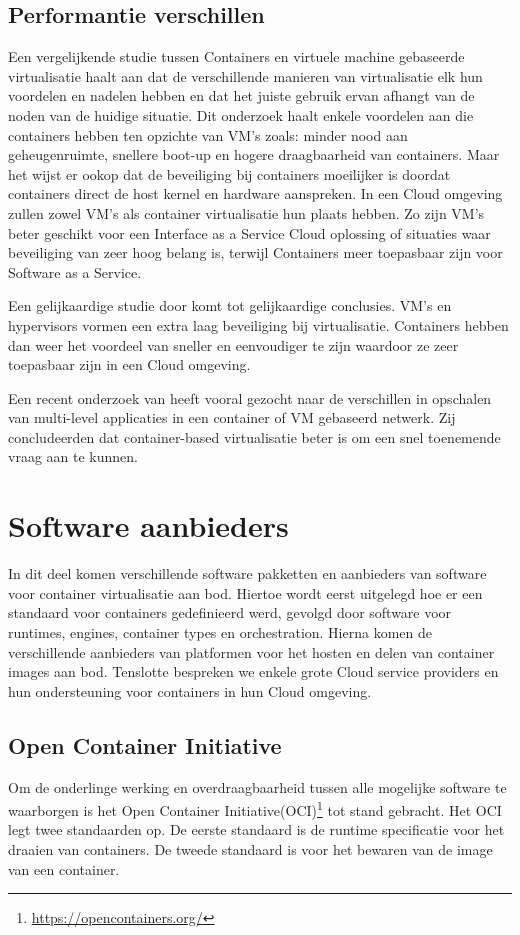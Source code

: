 \subsection{Performantie verschillen}
Een vergelijkende studie tussen Containers en virtuele machine gebaseerde virtualisatie\autocite{Yadav2018} haalt aan dat de verschillende manieren van virtualisatie elk hun voordelen en nadelen hebben en dat het juiste gebruik ervan afhangt van de noden van de huidige situatie. Dit onderzoek haalt enkele voordelen aan die containers hebben ten opzichte van VM’s zoals: minder nood aan geheugenruimte, snellere boot-up en hogere draagbaarheid van containers. Maar het wijst er ookop dat de beveiliging bij containers moeilijker is doordat containers direct de host kernel en hardware aanspreken. In een Cloud omgeving zullen zowel VM’s als container virtualisatie hun plaats hebben. Zo zijn VM’s beter geschikt voor een Interface as a Service Cloud oplossing of situaties waar beveiliging van zeer hoog belang is, terwijl Containers meer toepasbaar zijn voor Software as a Service.

Een gelijkaardige studie door \textcite{Eder2016} komt tot gelijkaardige conclusies. VM’s en hypervisors vormen een extra laag beveiliging bij virtualisatie. Containers hebben dan weer het voordeel van sneller en eenvoudiger te zijn waardoor ze zeer toepasbaar zijn in een Cloud omgeving.

Een recent onderzoek van \textcite{Abdullah2019} heeft vooral gezocht naar de verschillen in opschalen van multi-level applicaties in een container of VM gebaseerd netwerk. Zij concludeerden dat container-based virtualisatie beter is om een snel toenemende vraag aan te kunnen.


\section{Software aanbieders}
In dit deel komen verschillende software pakketten en aanbieders van software voor container virtualisatie aan bod. Hiertoe wordt eerst uitgelegd hoe er een standaard voor containers gedefinieerd werd, gevolgd door software voor runtimes, engines, container types en orchestration. Hierna komen de verschillende aanbieders van platformen voor het hosten en delen van container images aan bod. Tenslotte bespreken we enkele grote Cloud service providers en hun ondersteuning voor containers in hun Cloud omgeving.


\subsection{Open Container Initiative}
Om de onderlinge werking en overdraagbaarheid tussen alle mogelijke software te waarborgen is het Open Container Initiative(OCI)\footnote{\url{https://opencontainers.org/}} tot stand gebracht. Het OCI legt twee standaarden op. De eerste standaard is de runtime specificatie voor het draaien van containers. De tweede standaard is voor het bewaren van de image van een container.


